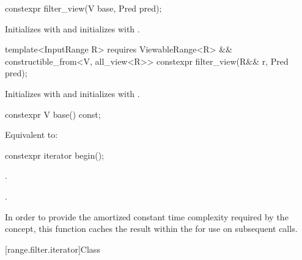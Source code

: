 %
\begin{itemdecl}
constexpr filter_view(V base, Pred pred);
\end{itemdecl}

\begin{itemdescr}
\pnum
\effects Initializes  with  and initializes
 with .
\end{itemdescr}

%
\begin{itemdecl}
template<InputRange R>
  requires ViewableRange<R> && constructible_from<V, all_view<R>>
constexpr filter_view(R&& r, Pred pred);
\end{itemdecl}

\begin{itemdescr}
\pnum
\effects Initializes  with 
and initializes  with .
\end{itemdescr}

%
\begin{itemdecl}
constexpr V base() const;
\end{itemdecl}

\begin{itemdescr}
\pnum
\effects Equivalent to: 
\end{itemdescr}

%
\begin{itemdecl}
constexpr iterator begin();
\end{itemdecl}

\begin{itemdescr}
\pnum
\expects
{}.

\pnum
\returns
{}.

\pnum
\remarks In order to provide the amortized constant time complexity required by
the  concept, this function caches the result within the
 for use on subsequent calls.
\end{itemdescr}

[range.filter.iterator]{Class }

